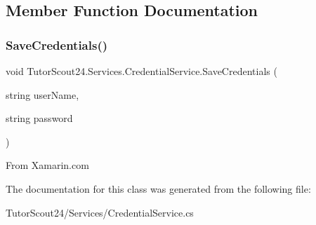 \subsection{Member Function Documentation}
\mbox{\label{class_tutor_scout24_1_1_services_1_1_credential_service_aec81b84086a196da0572d26634195a06}} 
\subsubsection{\texorpdfstring{Save\+Credentials()}{SaveCredentials()}}
{\footnotesize\ttfamily void Tutor\+Scout24.\+Services.\+Credential\+Service.\+Save\+Credentials (\begin{DoxyParamCaption}\item[{string}]{user\+Name,  }\item[{string}]{password }\end{DoxyParamCaption})\hspace{0.3cm}{\ttfamily [inline]}}

From Xamarin.\+com 

The documentation for this class was generated from the following file\+:\begin{DoxyCompactItemize}
\item 
Tutor\+Scout24/\+Services/Credential\+Service.\+cs\end{DoxyCompactItemize}
